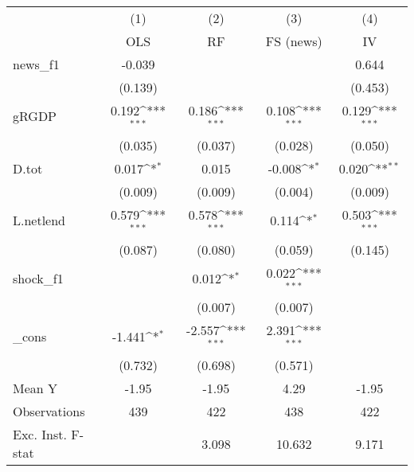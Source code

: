 {
\def\sym#1{\ifmmode^{#1}\else\(^{#1}\)\fi}
\begin{tabular}{l*{4}{c}}
\toprule
            &\multicolumn{1}{c}{(1)}&\multicolumn{1}{c}{(2)}&\multicolumn{1}{c}{(3)}&\multicolumn{1}{c}{(4)}\\
            &\multicolumn{1}{c}{OLS}&\multicolumn{1}{c}{RF}&\multicolumn{1}{c}{FS (news)}&\multicolumn{1}{c}{IV}\\
\midrule
news\_f1     &      -0.039         &                     &                     &       0.644         \\
            &     (0.139)         &                     &                     &     (0.453)         \\
\addlinespace
gRGDP       &       0.192\sym{***}&       0.186\sym{***}&       0.108\sym{***}&       0.129\sym{***}\\
            &     (0.035)         &     (0.037)         &     (0.028)         &     (0.050)         \\
\addlinespace
D.tot       &       0.017\sym{*}  &       0.015         &      -0.008\sym{*}  &       0.020\sym{**} \\
            &     (0.009)         &     (0.009)         &     (0.004)         &     (0.009)         \\
\addlinespace
L.netlend   &       0.579\sym{***}&       0.578\sym{***}&       0.114\sym{*}  &       0.503\sym{***}\\
            &     (0.087)         &     (0.080)         &     (0.059)         &     (0.145)         \\
\addlinespace
shock\_f1    &                     &       0.012\sym{*}  &       0.022\sym{***}&                     \\
            &                     &     (0.007)         &     (0.007)         &                     \\
\addlinespace
\_cons      &      -1.441\sym{*}  &      -2.557\sym{***}&       2.391\sym{***}&                     \\
            &     (0.732)         &     (0.698)         &     (0.571)         &                     \\
\midrule
Mean Y      &       -1.95         &       -1.95         &        4.29         &       -1.95         \\
Observations&         439         &         422         &         438         &         422         \\
Exc. Inst. F-stat&                     &       3.098         &      10.632         &       9.171         \\
\bottomrule
\end{tabular}
}
